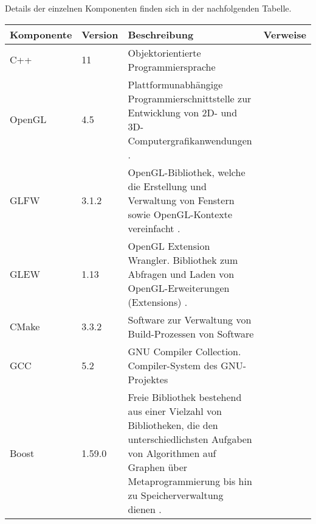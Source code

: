 
Details der einzelnen Komponenten finden sich in der nachfolgenden Tabelle.


\begin{tabular}{llp{10cm}l}
    \toprule
    \textbf{Komponente} & \textbf{Version} & \textbf{Beschreibung} & \textbf{Verweise} \\
    \midrule
    C++        & 11      & Objektorientierte Programmiersprache
                           &\protect\footnotemark\\

    OpenGL     & 4.5     & Plattformunabhängige Programmierschnittstelle zur
                           Entwicklung von 2D- und 3D-Computergrafikanwendungen
                           \parencite{wikipedia_the_free_encyclopedia_opengl_2015}.
                           &\protect\footnotemark\\

    GLFW       & 3.1.2   & OpenGL-Bibliothek, welche die Erstellung und
                           Verwaltung von Fenstern sowie OpenGL-Kontexte
                           vereinfacht
                           \parencite{wikipedia_the_free_encyclopedia_glfw_2015}.
                           &\protect\footnotemark\\

    GLEW       & 1.13    & OpenGL Extension Wrangler. Bibliothek zum Abfragen
                           und Laden von OpenGL-Erweiterungen (Extensions)
                           \parencite{wikipedia_the_free_encyclopedia_opengl_2015-1}.
                           &\protect\footnotemark\\

    CMake      & 3.3.2   & Software zur Verwaltung von Build-Prozessen von 
                           Software
                           &\protect\footnotemark\\

    GCC        & 5.2     & GNU Compiler Collection. Compiler-System des
                           GNU-Projektes
                           &\protect\footnotemark\\

    Boost      & 1.59.0  & Freie Bibliothek bestehend aus einer Vielzahl von
                           Bibliotheken, die den unterschiedlichsten
                           Aufgaben von Algorithmen auf Graphen über 
                           Metaprogrammierung bis hin zu Speicherverwaltung
                           dienen
                           \parencite{wikipedia_the_free_encyclopedia_boost_2015}.
                           &\protect\footnotemark\\
    \bottomrule
\end{tabular}
